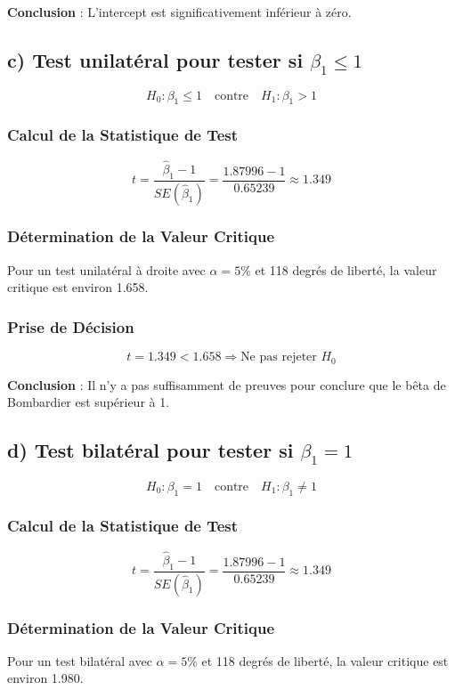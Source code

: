 \documentclass[14pt]{extarticle} %
\theoremstyle{definition}
\theoremstyle{plain}
\begin{document}
\textbf{Conclusion} : L'intercept est significativement inférieur à zéro.

\subsection*{c) Test unilatéral pour tester si \(\beta_1 \leq 1\)}
\[
H_0 : \beta_1 \leq 1 \quad \text{contre} \quad H_1 : \beta_1 > 1
\]

\subsubsection*{Calcul de la Statistique de Test}
\[
t = \frac{\hat{\beta}_1 - 1}{SE(\hat{\beta}_1)} = \frac{1.87996 - 1}{0.65239} \approx 1.349
\]

\subsubsection*{Détermination de la Valeur Critique}
Pour un test unilatéral à droite avec \(\alpha = 5\%\) et 118 degrés de liberté, la valeur critique est environ 1.658.

\subsubsection*{Prise de Décision}
\[
t = 1.349 < 1.658 \Rightarrow \text{Ne pas rejeter } H_0
\]

\textbf{Conclusion} : Il n'y a pas suffisamment de preuves pour conclure que le bêta de Bombardier est supérieur à 1.

\subsection*{d) Test bilatéral pour tester si \(\beta_1 = 1\)}
\[
H_0 : \beta_1 = 1 \quad \text{contre} \quad H_1 : \beta_1 \neq 1
\]

\subsubsection*{Calcul de la Statistique de Test}
\[
t = \frac{\hat{\beta}_1 - 1}{SE(\hat{\beta}_1)} = \frac{1.87996 - 1}{0.65239} \approx 1.349
\]

\subsubsection*{Détermination de la Valeur Critique}
Pour un test bilatéral avec \(\alpha = 5\%\) et 118 degrés de liberté, la valeur critique est environ 1.980.
\end{document}
